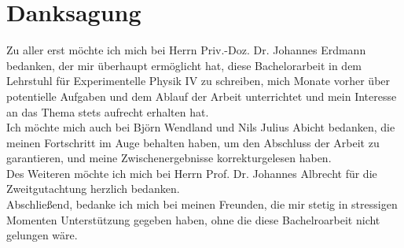 \chapter{Danksagung}

Zu aller erst möchte ich mich bei Herrn Priv.-Doz. Dr. Johannes Erdmann bedanken, der mir überhaupt ermöglicht hat, diese Bachelorarbeit in dem Lehrstuhl für Experimentelle Physik IV zu schreiben, 
mich Monate vorher über potentielle Aufgaben und dem Ablauf der Arbeit unterrichtet und mein Interesse an das Thema stets aufrecht erhalten hat.\\
Ich möchte mich auch bei Björn Wendland und Nils Julius Abicht bedanken, die meinen Fortschritt im Auge behalten haben, um den Abschluss der Arbeit zu garantieren, 
und meine Zwischenergebnisse korrekturgelesen haben. \\
Des Weiteren möchte ich mich bei Herrn Prof. Dr. Johannes Albrecht für die Zweitgutachtung herzlich bedanken. \\
Abschließend, bedanke ich mich bei meinen Freunden, die mir stetig in stressigen Momenten Unterstützung gegeben haben, ohne die diese Bachelroarbeit nicht gelungen wäre.  
